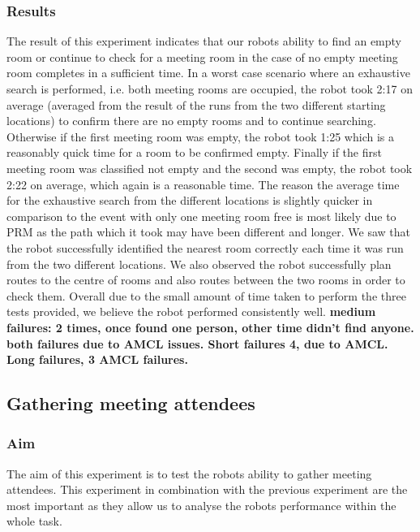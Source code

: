 \documentclass[conference]{IEEEtran}
\begin{document}
\subsubsection{Results}
The result of this experiment indicates that our robots ability to find an empty room or continue to check for a meeting room in the case of no empty meeting room completes in a sufficient time. In a worst case scenario where an exhaustive search is performed, i.e. both meeting rooms are occupied, the robot took 2:17 on average (averaged from the result of the runs from the two different starting locations) to confirm there are no empty rooms and to continue searching. Otherwise if the first meeting room was empty, the robot took 1:25 which is a reasonably quick time for a room to be confirmed empty. Finally if the first meeting room was classified not empty and the second was empty, the robot took 2:22 on average, which again is a reasonable time. The reason the average time for the exhaustive search from the different locations is slightly quicker in comparison to the event with only one meeting room free is most likely due to PRM as the path which it took may have been different and longer. We saw that the robot successfully identified the nearest room correctly each time it was run from the two different locations. We also observed the robot successfully plan routes to the centre of rooms and also routes between the two rooms in order to check them. Overall due to the small amount of time taken to perform the three tests provided, we believe the robot performed consistently well.
\textbf{medium failures: 2 times, once found one person, other time didn't find anyone. both failures due to AMCL issues. Short failures 4, due to AMCL. Long failures, 3 AMCL failures.}

\subsection{Gathering meeting attendees}
\subsubsection{Aim}
The aim of this experiment is to test the robots ability to gather meeting attendees. This experiment in combination with the previous experiment are the most important as they allow us to analyse the robots performance within the whole task.
\end{document}
